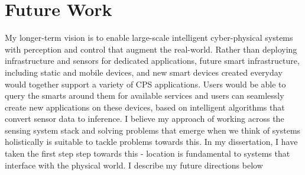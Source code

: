 \documentclass[11pt]{article}
\begin{document}
\section{Future Work}
My longer-term vision is to enable large-scale intelligent cyber-physical systems with perception and control that augment the real-world. Rather than deploying infrastructure and sensors for dedicated applications, future smart infrastructure, including static and mobile devices, and new smart devices created everyday would together support a variety of CPS applications. Users would be able to query the smarts around them for available services and users can seamlessly create new applications on these devices, based on intelligent algorithms that convert sensor data to inference. %
I believe my approach of working across the sensing system stack and solving problems that emerge when we think of systems holistically is suitable to tackle problems towards this. In my dissertation, I have taken the first step step towards this - %
location is fundamental to systems that interface with the physical world.  I describe my future directions below\\
\end{document}
